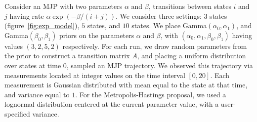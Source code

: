 \noindent Consider an MJP with two parameters $\alpha$ and $\beta$, 
transitions between states $i$ and $j$ having rate $\alpha \exp(-\beta/(i+j))$.
We consider three settings: $3$ states (figure~\ref{fig:exp_model}),
$5$ states, and $10$ states.
We place Gamma$(\alpha_0,\alpha_1)$, and Gamma$(\beta_0, \beta_1)$ priors on 
the parameters $\alpha$ and $\beta$, with $(\alpha_0,\alpha_1,\beta_0,\beta_1)$ 
having values $(3,2,5,2)$ respectively. For each run, we draw random parameters 
from the prior to construct a transition matrix $A$, and placing a uniform 
distribution over states at time $0$, sampled an MJP trajectory.
We observed this trajectory via measurements located at integer 
values on the time interval $[0, 20]$. Each measurement is Gaussian distributed 
with mean equal to the state at that time, and variance equal to $1$.
For the Metropolis-Hastings proposal, we used a lognormal distribution centered 
at the current parameter value, with a user-specified variance.

